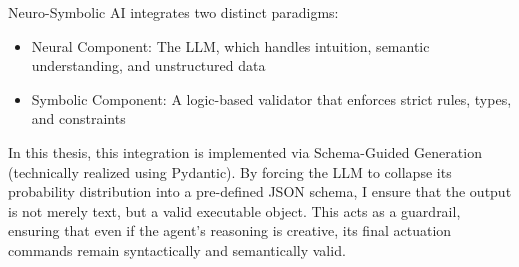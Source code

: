 Neuro-Symbolic AI integrates two distinct paradigms:
\begin{itemize}
	\item Neural Component: The LLM, which handles intuition, semantic understanding, and unstructured data %
	\item Symbolic Component: A logic-based validator that enforces strict rules, types, and constraints %
\end{itemize}
In this thesis, this integration is implemented via Schema-Guided Generation (technically realized using Pydantic). By forcing the LLM to collapse its probability distribution into a pre-defined JSON schema, I ensure that the output is not merely text, but a valid executable object. This acts as a guardrail, ensuring that even if the agent’s reasoning is creative, its final actuation commands remain syntactically and semantically valid.
%
%
%
